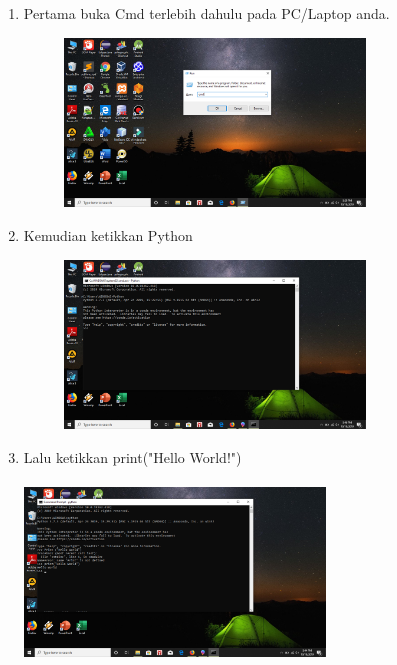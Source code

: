 \documentclass{article}
\begin{document}
\begin{enumerate}
    \item Pertama buka Cmd terlebih dahulu pada PC/Laptop anda.
        \begin{figure}[h]
            \centerline{\includegraphics[width=8cm]{image/cmd.png}}
        \end{figure}
    \item Kemudian ketikkan Python
        \begin{figure}[h]
            \centerline{\includegraphics[width=8cm]{image/python.png}}
        \end{figure}
    \item Lalu ketikkan print("Hello World!")
    \paragraph{}
            \centerline{\includegraphics[width=8cm]{image/printhelloworld.png}}
\end{enumerate}
\end{document}
